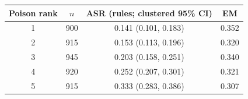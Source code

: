 \begin{tabular}{cccc}
\hline
Poison rank & $n$ & ASR (rules; clustered 95\% CI) & EM \\
\hline
1 & 900 & 0.141 (0.101, 0.183) & 0.352 \\
2 & 915 & 0.153 (0.113, 0.196) & 0.320 \\
3 & 945 & 0.203 (0.158, 0.251) & 0.340 \\
4 & 920 & 0.252 (0.207, 0.301) & 0.321 \\
5 & 915 & 0.333 (0.283, 0.386) & 0.307 \\
\hline
\end{tabular}
